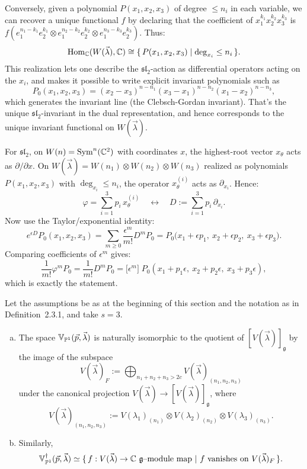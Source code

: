 \documentclass[12pt]{article}
\begin{document}
\begin{remark}
    Conversely, given a polynomial $P(x_1,x_2,x_3)$ of degree $\leq n_i$ in each variable, we can recover a unique functional $f$ by declaring that the coefficient of $x_1^{k_1}x_2^{k_2}x_3^{k_3}$ is $f(e_1^{n_1-k_1}e_2^{k_1}\otimes e_1^{n_2-k_2}e_2^{k_2}\otimes e_1^{n_3-k_3}e_2^{k_3})$. Thus:
    \[\Hom_\C(W(\vec\lambda),\C) \cong \{\,P(x_1,x_2,x_3)\mid \deg_{x_i}\le n_i\,\}.\]
    This realization lets one describe the $\mathfrak{sl}_2$-action as differential operators acting on the $x_i$, and makes it possible to write explicit invariant polynomials such as
    \[P_0(x_1,x_2,x_3) = (x_2-x_3)^{n-n_1}(x_3-x_1)^{n-n_2}(x_1-x_2)^{n-n_3},\]
    which generates the invariant line (the Clebsch-Gordan invariant). That's the unique $\mathfrak{sl}_2$-invariant in the dual representation, and hence corresponds to the unique invariant functional on $W(\vec\lambda)$.

    For $\mathfrak{sl}_2$, on $W(n)=\operatorname{Sym}^n(\C^2)$ with coordinates $x$, the highest-root vector $x_\theta$ acts as $\partial/\partial x$.
    On $W(\vec\lambda)=W(n_1)\otimes W(n_2)\otimes W(n_3)$ realized as polynomials $P(x_1,x_2,x_3)$ with $\deg_{x_i}\le n_i$, the operator $x_\theta^{(i)}$ acts as $\partial_{x_i}$. Hence:
    \[
    \varphi=\sum_{i=1}^3 p_i\,x_\theta^{(i)}\quad\longleftrightarrow\quad
    D:=\sum_{i=1}^3 p_i\,\partial_{x_i}.
    \]
    Now use the Taylor/exponential identity:
    \[
    e^{\epsilon D}P_0(x_1,x_2,x_3)
    =\sum_{m\ge0}\frac{\epsilon^m}{m!}D^m P_0
    =P_0\big(x_1+\epsilon p_1,\ x_2+\epsilon p_2,\ x_3+\epsilon p_3\big).
    \]
    Comparing coefficients of $\epsilon^m$ gives:
    \[
    \frac{1}{m!}\varphi^{m}P_0
    =\frac{1}{m!}D^m P_0
    =\big[\epsilon^m\big]\;
    P_0(x_1+p_1\epsilon,\ x_2+p_2\epsilon,\ x_3+p_3\epsilon),
    \]
    which is exactly the statement.
\end{remark}

\begin{corollary}
Let the assumptions be as at the beginning of this section and the notation as in Definition~2.3.1, and take $s=3$.
\begin{enumerate}[(a)]
\item
The space $\mathbb V_{\P^1}(\vec p,\vec\lambda)$ is naturally isomorphic to the quotient of $[V(\vec\lambda)]_{\mathfrak g}$ by the image of the subspace
\[
V(\vec\lambda)_F
:=\bigoplus_{n_1+n_2+n_3>2c}V(\vec\lambda)_{(n_1,n_2,n_3)}
\]
under the canonical projection
$V(\vec\lambda)\to[V(\vec\lambda)]_{\mathfrak g}$,
where
\[
V(\vec\lambda)_{(n_1,n_2,n_3)}:=
V(\lambda_1)_{(n_1)}\otimes V(\lambda_2)_{(n_2)}\otimes V(\lambda_3)_{(n_3)}.
\]

\item
Similarly,
\[
\mathbb V_{\P^1}^\dagger(\vec p,\vec\lambda)
\simeq
\{\,f:V(\vec\lambda)\to\C\text{ $\mathfrak g$–module map }|\ f\text{ vanishes on }V(\vec\lambda)_F\,\}.
\]
\end{enumerate}
\end{corollary}
\end{document}
